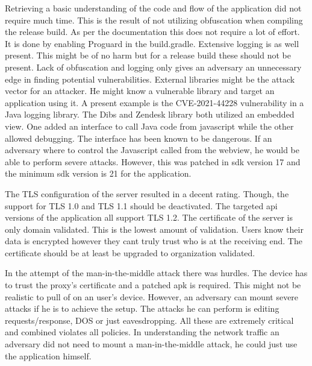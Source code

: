 Retrieving a basic understanding of the code and flow of the application did not require much time. This is the result of not utilizing obfuscation when compiling the release build. As per the documentation\cite{android-obfuscation} this does not require a lot of effort. It is done by enabling Proguard in the build.gradle. Extensive logging is as well present. This might be of no harm but for a release build these should not be present. Lack of obfuscation and logging only gives an adversary an unnecessary edge in finding potential vulnerabilities. External libraries might be the attack vector for an attacker. He might know a vulnerable library and target an application using it. A present example is the CVE-2021-44228 vulnerability in a Java logging library\cite{log4j}. The Dibs and Zendesk library both utilized an embedded view. One added an interface to call Java code from javascript while the other allowed debugging. The interface has been known to be dangerous. If an adversary where to control the Javascript called from the webview, he would be able to perform severe attacks. However, this was patched in sdk version 17 and the minimum sdk version is 21 for the application.

The TLS configuration of the server resulted in a decent rating. Though, the support for TLS 1.0 and TLS 1.1 should be deactivated. The targeted api versions of the application all support TLS 1.2\cite{android-sslsocket}. The certificate of the server is only domain validated. This is the lowest amount of validation. Users know their data is encrypted however they cant truly trust who is at the receiving end. The certificate should be at least be upgraded to organization validated.

In the attempt of the man-in-the-middle attack there was hurdles. The device has to trust the proxy's certificate and a patched apk is required. This might not be realistic to pull of on an user's device. However, an adversary can mount severe attacks if he is to achieve the setup. The attacks he can perform is editing requests/response, DOS or just eavesdropping. All these are extremely critical and combined violates all policies. In understanding the network traffic an adversary did not need to mount a man-in-the-middle attack, he could just use the application himself.

